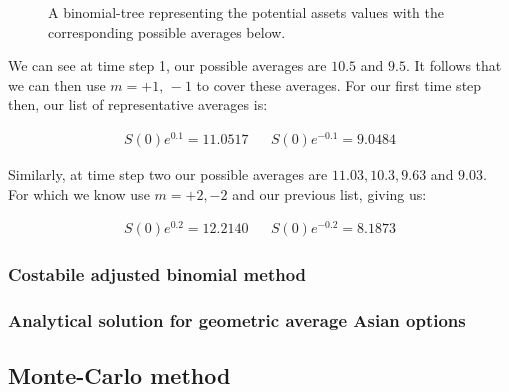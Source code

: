 \begin{figure}[H]
    \centering
    \caption{A binomial-tree representing the potential assets values with the corresponding possible averages below.}
\end{figure}

We can see at time step 1, our possible averages are \(10.5\) and \(9.5\). It follows that we can then use \(m = +1,\, -1\) to cover these averages. For our first time step then, our list of representative averages is:

\begin{align*}
    S(0)e^{0.1} = 11.0517 && S(0)e^{-0.1} = 9.0484
\end{align*}

Similarly, at time step two our possible averages are \(11.03,10.3,9.63\) and \(9.03\). For which we know use \(m = +2, -2\) and our previous list, giving us:

\begin{align*}
    S(0)e^{0.2} = 12.2140 && S(0)e^{-0.2} = 8.1873
\end{align*}

\subsubsection{Costabile adjusted binomial method}

\subsubsection{Analytical solution for geometric average Asian options}

\subsection{Monte-Carlo method}